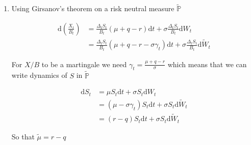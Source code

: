 \documentclass[12pt]{book}
\numberwithin{equation}{chapter}
\theoremstyle{plain}
\numberwithin{theorem}{section}
\theoremstyle{definition}
\numberwithin{exercise}{chapter}
\newcommand{\<}{\langle}
\renewcommand{\>}{\rangle}
\renewcommand{\(}{\left(}
\renewcommand{\)}{\right)}
\renewcommand{\[}{\left[}
\renewcommand{\]}{\right]}
\newcommand\dd{\mathrm{d}}
\theoremstyle{definition}
\numberwithin{question}{section}
\begin{document}
\begin{enumerate}
    Since $X$ replicates the option price $V$ we want
    
    \begin{align*}
        0 & = \dd (\frac{V_t}{B_t}) - \dd (\frac{X_t}{B_t}) \\
        {} & = \frac{1}{B_t}[v_t(t,S_t) + \mu S_t v_s(t,S_t) + \frac{1}{2}\sigma^2 S^2_t v_{ss}(t,S_t)-rv(t,S_t)] \dd t + \frac{1}{B_t}\sigma v_s(t,S_t)  S_t \dd W_t \\
        {} & - \frac{\Delta_t S_t}{B_t}(\mu+q-r) \dd t - \sigma \frac{\Delta_t S_t}{B_t} \dd W_t \\
        {} & = \frac{1}{B_t}[v_t(t,S_t) + \mu S_t v_s(t,S_t) + \frac{1}{2}\sigma^2 S^2_t v_{ss}(t,S_t)-rv(t,S_t) - \Delta_t S_t(\mu+q-r) ] \dd t \\
        {} & + \frac{\sigma S_t}{B_t}(v_s(t,S_t) - \Delta_t) \dd W_t
    \end{align*}
    
    Both coefficients of $\dd t$ and $\dd W_t$ has to be zero. For $\dd W_t$ term to be zero we need $\Delta_t = v_s(t,S_t)$ so we can get from the fact that coefficients of $\dd t$ has to be zero
    
    \begin{align*}
        0 & = v_t(t,S_t) + \mu S_t v_s(t,S_t) + \frac{1}{2}\sigma^2 S^2_t v_{ss}(t,S_t)-rv(t,S_t) - \Delta_t S_t(\mu+q-r) \\
        {} & = v_t(t,S_t) + \mu S_t v_s(t,S_t) + \frac{1}{2}\sigma^2 S^2_t v_{ss}(t,S_t)-rv(t,S_t) - v_s(t,S_t) S_t(\mu+q-r) \\
        {} & = v_t(t,S_t) + (r-q) S_t v_s(t,S_t) + \frac{1}{2}\sigma^2 S^2_t v_{ss}(t,S_t)-rv(t,S_t)
    \end{align*}
    
    \item Using Girsanov's theorem on a risk neutral measure $\widetilde{\mathds{P}}$
    
    \begin{align*}
        \dd (\frac{X_t}{B_t}) & = \frac{\Delta_t S_t}{B_t}(\mu+q-r) \dd t + \sigma \frac{\Delta_t S_t}{B_t} \dd W_t \\
        {} & = \frac{\Delta_t S_t}{B_t}(\mu+q-r - \sigma \gamma_t) \dd t + \sigma \frac{\Delta_t S_t}{B_t} \dd \widetilde{W}_t
    \end{align*}
    
    For $X/B$ to be a martingale we need $\gamma_t = \frac{\mu+q-r}{\sigma}$ which means that we can write dynamics of $S$ in $\widetilde{\mathds{P}}$
    
    \begin{align*}
        \dd S_t & = \mu S_t \dd t + \sigma S_t \dd W_t \\
        {} & = (\mu-\sigma \gamma_t)S_t \dd t + \sigma S_t \dd \widetilde{W}_t \\
        {} & = (r-q) S_t \dd t + \sigma S_t \dd \widetilde{W}_t
    \end{align*}
    
    So that $\widetilde{\mu} = r-q$
    
    
\end{enumerate}
\end{document}
